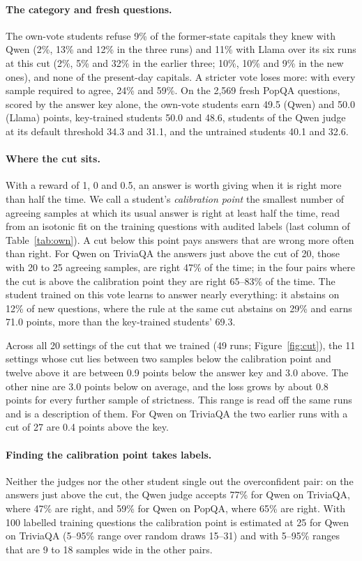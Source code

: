 \documentclass[11pt,a4paper,twocolumn]{article}
\begin{document}
\paragraph{The category and fresh questions.} The own-vote students refuse 9\% of the former-state capitals they knew with Qwen (2\%, 13\% and 12\% in the three runs) and 11\% with Llama over its six runs at this cut (2\%, 5\% and 32\% in the earlier three; 10\%, 10\% and 9\% in the new ones), and none of the present-day capitals. A stricter vote loses more: with every sample required to agree, 24\% and 59\%. On the 2{,}569 fresh PopQA questions, scored by the answer key alone, the own-vote students earn 49.5 (Qwen) and 50.0 (Llama) points, key-trained students 50.0 and 48.6, students of the Qwen judge at its default threshold 34.3 and 31.1, and the untrained students 40.1 and 32.6.

\paragraph{Where the cut sits.} With a reward of 1, 0 and 0.5, an answer is worth giving when it is right more than half the time. We call a student's \emph{calibration point} the smallest number of agreeing samples at which its usual answer is right at least half the time, read from an isotonic fit on the training questions with audited labels (last column of Table~\ref{tab:own}). A cut below this point pays answers that are wrong more often than right. For Qwen on TriviaQA the answers just above the cut of 20, those with 20 to 25 agreeing samples, are right 47\% of the time; in the four pairs where the cut is above the calibration point they are right 65--83\% of the time. The student trained on this vote learns to answer nearly everything: it abstains on 12\% of new questions, where the rule at the same cut abstains on 29\% and earns 71.0 points, more than the key-trained students' 69.3.

Across all 20 settings of the cut that we trained (49 runs; Figure~\ref{fig:cut}), the 11 settings whose cut lies between two samples below the calibration point and twelve above it are between 0.9 points below the answer key and 3.0 above. The other nine are 3.0 points below on average, and the loss grows by about 0.8 points for every further sample of strictness. This range is read off the same runs and is a description of them. For Qwen on TriviaQA the two earlier runs with a cut of 27 are 0.4 points above the key.

\paragraph{Finding the calibration point takes labels.} Neither the judges nor the other student single out the overconfident pair: on the answers just above the cut, the Qwen judge accepts 77\% for Qwen on TriviaQA, where 47\% are right, and 59\% for Qwen on PopQA, where 65\% are right. With 100 labelled training questions the calibration point is estimated at 25 for Qwen on TriviaQA (5--95\% range over random draws 15--31) and with 5--95\% ranges that are 9 to 18 samples wide in the other pairs.
\end{document}
